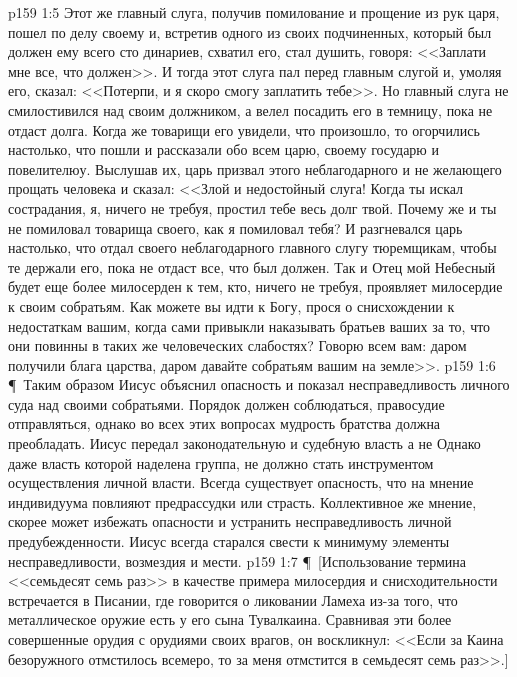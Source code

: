\vs p159 1:5 Этот же главный слуга, получив помилование и прощение из рук царя, пошел по делу своему и, встретив одного из своих подчиненных, который был должен ему всего сто динариев, схватил его, стал душить, говоря: <<Заплати мне все, что должен>>. И тогда этот слуга пал перед главным слугой и, умоляя его, сказал: <<Потерпи, и я скоро смогу заплатить тебе>>. Но главный слуга не смилостивился над своим должником, а велел посадить его в темницу, пока не отдаст долга. Когда же товарищи его увидели, что произошло, то огорчились настолько, что пошли и рассказали обо всем царю, своему государю и повелителюу. Выслушав их, царь призвал этого неблагодарного и не желающего прощать человека и сказал: <<Злой и недостойный слуга! Когда ты искал сострадания, я, ничего не требуя, простил тебе весь долг твой. Почему же и ты не помиловал товарища своего, как я помиловал тебя? И разгневался царь настолько, что отдал своего неблагодарного главного слугу тюремщикам, чтобы те держали его, пока не отдаст все, что был должен. Так и Отец мой Небесный будет еще более милосерден к тем, кто, ничего не требуя, проявляет милосердие к своим собратьям. Как можете вы идти к Богу, прося о снисхождении к недостаткам вашим, когда сами привыкли наказывать братьев ваших за то, что они повинны в таких же человеческих слабостях? Говорю всем вам: даром получили блага царства, даром давайте собратьям вашим на земле>>.
\vs p159 1:6 \P\ Таким образом Иисус объяснил опасность и показал несправедливость личного суда над своими собратьями. Порядок должен соблюдаться, правосудие отправляться, однако во всех этих вопросах мудрость братства должна преобладать. Иисус передал законодательную и судебную власть  а не  Однако даже власть которой наделена группа, не должно стать инструментом осуществления личной власти. Всегда существует опасность, что на мнение индивидуума повлияют предрассудки или страсть. Коллективное же мнение, скорее может избежать опасности и устранить несправедливость личной предубежденности. Иисус всегда старался свести к минимуму элементы несправедливости, возмездия и мести.
\vs p159 1:7 \P\ [Использование термина <<семьдесят семь раз>> в качестве примера милосердия и снисходительности встречается в Писании, где говорится о ликовании Ламеха из\hyp{}за того, что металлическое оружие есть у его сына Тувалкаина. Сравнивая эти более совершенные орудия с орудиями своих врагов, он воскликнул: <<Если за Каина безоружного отмстилось всемеро, то за меня отмстится в семьдесят семь раз>>.]
